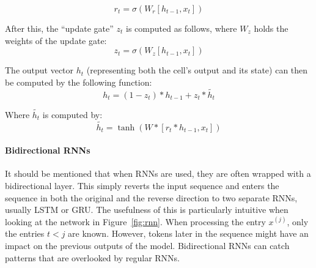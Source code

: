             \begin{equation} \label{eq:gru_reset_gate}
                r_t = \sigma(W_r [h_{t-1}, x_t])
            \end{equation}

            After this, the ``update gate'' \(z_t\) is computed as follows, where \(W_z\) holds the weights of the update gate:
            \begin{equation} \label{eq:gru_update_gate}
                z_t = \sigma(W_z [h_{t-1}, x_t])
            \end{equation}

            The output vector \(h_t\) (representing both the cell's output and its state) can then be computed by the following function:
            \begin{equation} \label{eq:gru_output}
                h_t = (1 - z_t) * h_{t-1} + z_t * \tilde{h_t}
            \end{equation}

            Where \(\tilde{h_t}\) is computed by:
            \begin{equation} \label{eq:gru_output_partial}
                \tilde{h_t} = \tanh(W * [r_t * h_{t-1}, x_t])
            \end{equation}

            \paragraph{Bidirectional RNNs} It should be mentioned that when RNNs are used, they are often wrapped with a bidirectional layer.
            This simply reverts the input sequence and enters the sequence in both the original and the reverse direction to two separate RNNs, usually LSTM or GRU. 
            The usefulness of this is particularly intuitive when looking at the network in Figure~\ref{fig:rnn}. 
            When processing the entry $x^{(j)}$, only the entries $t < j$ are known. 
            However, tokens later in the sequence might have an impact on the previous outputs of the model. 
            Bidirectional RNNs can catch patterns that are overlooked by regular RNNs.
